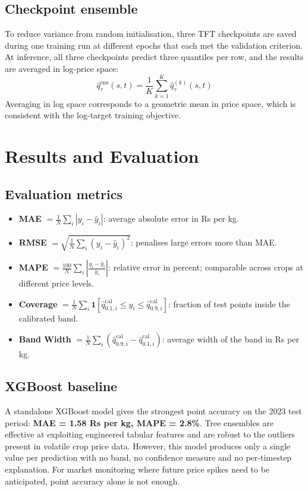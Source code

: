\documentclass[conference,twoside]{IEEEtran}
\begin{document}
\subsection{Checkpoint ensemble}
To reduce variance from random initialisation, three TFT checkpoints are saved during one training run at different epochs that each met the validation criterion. At inference, all three checkpoints predict three quantiles per row, and the results are averaged in log-price space:
\begin{equation}
\hat{q}_\tau^{\text{ens}}(s,t) = \frac{1}{K} \sum_{k=1}^{K} \hat{q}_\tau^{(k)}(s,t)
\label{eq:ensemble}
\end{equation}
Averaging in log space corresponds to a geometric mean in price space, which is consistent with the log-target training objective.

\section{Results and Evaluation}
\label{sec:results}

\subsection{Evaluation metrics}
\begin{itemize}
    \item \textbf{MAE} $= \frac{1}{N} \sum_i |y_i - \hat{y}_i|$: average absolute error in Rs per kg.
    \item \textbf{RMSE} $= \sqrt{\frac{1}{N} \sum_i (y_i - \hat{y}_i)^2}$: penalises large errors more than MAE.
    \item \textbf{MAPE} $= \frac{100}{N} \sum_i \left| \frac{y_i - \hat{y}_i}{y_i} \right|$: relative error in percent; comparable across crops at different price levels.
    \item \textbf{Coverage} $= \frac{1}{N} \sum_i \mathbf{1}\!\left[ \hat{q}_{0.1,i}^{\text{cal}} \leq y_i \leq \hat{q}_{0.9,i}^{\text{cal}} \right]$: fraction of test points inside the calibrated band.
    \item \textbf{Band Width} $= \frac{1}{N} \sum_i (\hat{q}_{0.9,i}^{\text{cal}} - \hat{q}_{0.1,i}^{\text{cal}})$: average width of the band in Rs per kg.
\end{itemize}

\subsection{XGBoost baseline}
A standalone XGBoost model gives the strongest point accuracy on the 2023 test period: \textbf{MAE = 1.58 Rs per kg, MAPE = 2.8\%}. Tree ensembles are effective at exploiting engineered tabular features and are robust to the outliers present in volatile crop price data. However, this model produces only a single value per prediction with no band, no confidence measure and no per-timestep explanation. For market monitoring where future price spikes need to be anticipated, point accuracy alone is not enough.
\end{document}
